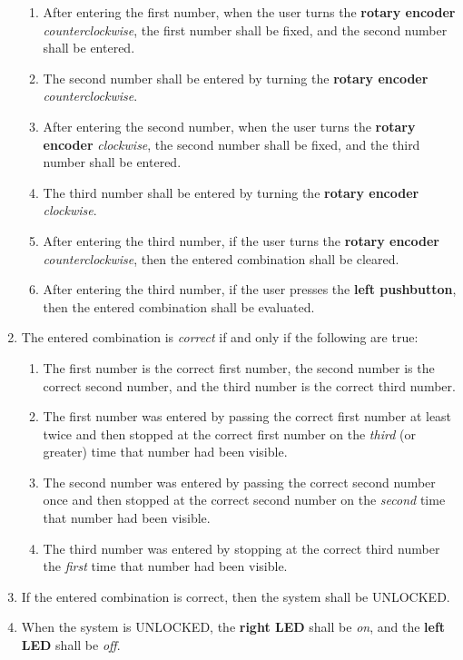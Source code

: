 \begin{enumerate}[start=\value{enumi}]
\begin{enumerate}
            \item After entering the first number, when the user turns the \textbf{rotary encoder} \textit{counterclockwise}, the first number shall be fixed, and the second number shall be entered.
            \item The second number shall be entered by turning the \textbf{rotary encoder} \textit{counterclockwise}.
            \item After entering the second number, when the user turns the \textbf{rotary encoder} \textit{clockwise}, the second number shall be fixed, and the third number shall be entered.
            \item The third number shall be entered by turning the \textbf{rotary encoder} \textit{clockwise}.
            \item After entering the third number, if the user turns the \textbf{rotary encoder} \textit{counterclockwise}, then the entered combination shall be cleared.
            \item After entering the third number, if the user presses the \textbf{left pushbutton}, then the entered combination shall be evaluated.
        \end{enumerate}
    \item \label{spec:verifyCombination} The entered combination is \textit{correct} if and only if the following are true:
        \begin{enumerate}
            \item The first number is the correct first number, the second number is the correct second number, and the third number is the correct third number.
            \item The first number was entered by passing the correct first number at least twice and then stopped at the correct first number on the \textit{third} (or greater) time that number had been visible.
            \item The second number was entered by passing the correct second number once and then stopped at the correct second number on the \textit{second} time that number had been visible.
            \item The third number was entered by stopping at the correct third number the \textit{first} time that number had been visible.
        \end{enumerate}
    \item If the entered combination is correct, then the system shall be UNLOCKED\@.
    \item When the system is UNLOCKED, the \textbf{right LED} shall be \textit{on}, and the \textbf{left LED} shall be \textit{off}.

\end{enumerate}
